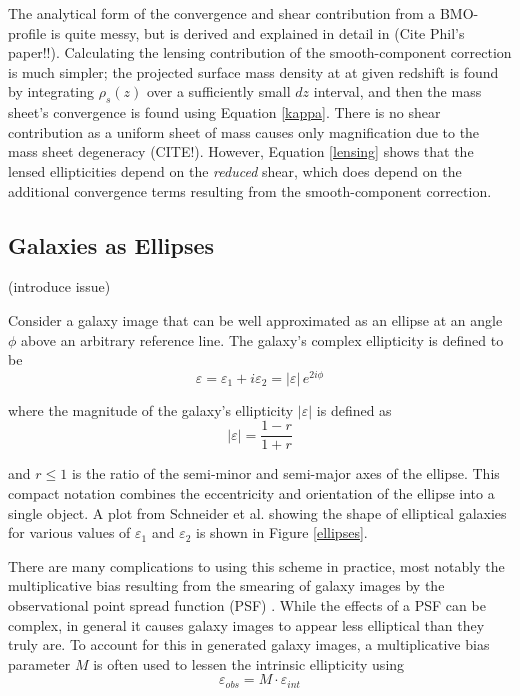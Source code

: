 \documentclass[%
 reprint,
 amsmath,amssymb,
 aps,nofootinbib
]{revtex4-1}
\begin{document}
 The analytical form of the convergence and shear contribution from a BMO-profile is quite messy, but is derived and explained in detail in (Cite Phil's paper!!). Calculating the lensing contribution of the smooth-component correction is much simpler; the projected surface mass density at at given redshift is found by integrating $\rho_s(z)$ over a sufficiently small $dz$ interval, and then the mass sheet's convergence is found using Equation \eqref{kappa}. There is no shear contribution as a uniform sheet of mass causes only magnification due to the mass sheet degeneracy (CITE!). However, Equation \eqref{lensing} shows that the lensed ellipticities depend on the \textit{reduced} shear, which does depend on the additional convergence terms resulting from the smooth-component correction.

\subsection{Galaxies as Ellipses} \label{galaxies_as_ellipses}

(introduce issue)

Consider a galaxy image that can be well approximated as an ellipse at an angle $\phi$ above an arbitrary reference line. The galaxy's complex ellipticity is defined to be
\begin{equation}\label{complex_ellipticity}
\varepsilon=\varepsilon_1+i\varepsilon_2=|\varepsilon|\,e^{2i\phi}
\end{equation}

\noindent where the magnitude of the galaxy's ellipticity $|\varepsilon|$ is defined as
\begin{equation}
|\varepsilon|=\frac{1-r}{1+r}
\end{equation}

\noindent and $r\leq1$ is the ratio of the semi-minor and semi-major axes of the ellipse. This compact notation combines the eccentricity and orientation of the ellipse into a single object. A plot from Schneider et al. \cite{schneider} showing the shape of elliptical galaxies for various values of $\varepsilon_1$ and $\varepsilon_2$ is shown in Figure \ref{ellipses}.

There are many complications to using this scheme in practice, most notably the multiplicative bias resulting from the smearing of galaxy images by the observational point spread function (PSF) \cite{multiplicative_bias}. While the effects of a PSF can be complex, in general it causes galaxy images to appear less elliptical than they truly are. To account for this in generated galaxy images, a multiplicative bias parameter $M$ is often used to lessen the intrinsic ellipticity using
$$\varepsilon_{obs}=M\cdot\varepsilon_{int}$$
\end{document}
